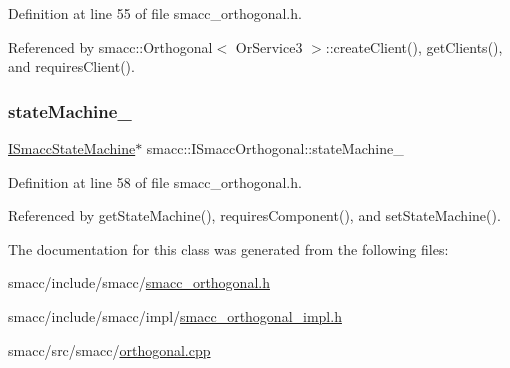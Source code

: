 Definition at line 55 of file smacc\+\_\+orthogonal.\+h.



Referenced by smacc\+::\+Orthogonal$<$ Or\+Service3 $>$\+::create\+Client(), get\+Clients(), and requires\+Client().

\mbox{\label{classsmacc_1_1ISmaccOrthogonal_a418b2e094a65013444ec1fca7e94f28d}} 
\subsubsection{\texorpdfstring{state\+Machine\+\_\+}{stateMachine\_}}
{\footnotesize\ttfamily \hyperlink{classsmacc_1_1ISmaccStateMachine}{I\+Smacc\+State\+Machine}$\ast$ smacc\+::\+I\+Smacc\+Orthogonal\+::state\+Machine\+\_\+\hspace{0.3cm}{\ttfamily [private]}}



Definition at line 58 of file smacc\+\_\+orthogonal.\+h.



Referenced by get\+State\+Machine(), requires\+Component(), and set\+State\+Machine().



The documentation for this class was generated from the following files\+:\begin{DoxyCompactItemize}
\item 
smacc/include/smacc/\hyperlink{smacc__orthogonal_8h}{smacc\+\_\+orthogonal.\+h}\item 
smacc/include/smacc/impl/\hyperlink{smacc__orthogonal__impl_8h}{smacc\+\_\+orthogonal\+\_\+impl.\+h}\item 
smacc/src/smacc/\hyperlink{orthogonal_8cpp}{orthogonal.\+cpp}\end{DoxyCompactItemize}
